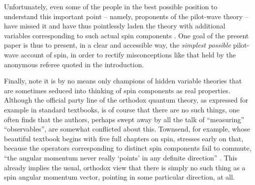 \documentclass[aps,prc,onecolumn,letterpaper,floatfix,12pt]{revtex4}
\begin{document}
Unfortunately, even some of the people in the best possible position
to understand this important point -- namely, proponents of the
pilot-wave theory -- have missed it and have thus pointlessly laden the
theory with additional variables
corresponding to such actual spin components \cite{holland}.    One
goal of the present paper is thus to present, in a clear and
accessible way, the \emph{simplest possible} pilot-wave account of spin, in
order to rectify misconceptions like that held by the anonymous
referee quoted in the introduction.  

Finally, note it is by no means only
champions of hidden variable theories that are sometimes seduced into
thinking of spin components as real properties.
Although the official party line of the orthodox quantum theory, as
expressed for example in standard textbooks, is of course that there
are no such things, one often finds that the authors, perhaps swept
away by all the talk of ``measuring'' ``observables'', are somewhat
conflicted about this.  Townsend, for example, whose beautiful
textbook begins with five full chapters on spin, stresses early on
that, because the operators corresponding to distinct spin components
fail to commute, ``the angular momentum never really `points' in any
definite direction'' \cite{townsend}.    This already implies the
usual, orthodox view that there is simply no such thing as a spin angular
momentum vector, pointing in some particular direction, at all.  
\end{document}
